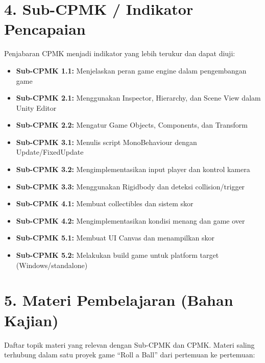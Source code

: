 \documentclass[12pt,a4paper]{article}
\begin{document}
\vspace{0.5cm}

\section*{4. Sub-CPMK / Indikator Pencapaian}

Penjabaran CPMK menjadi indikator yang lebih terukur dan dapat diuji:

\begin{itemize}[leftmargin=*]
  \item \textbf{Sub-CPMK 1.1:} Menjelaskan peran game engine dalam pengembangan game
  \item \textbf{Sub-CPMK 2.1:} Menggunakan Inspector, Hierarchy, dan Scene View dalam Unity Editor
  \item \textbf{Sub-CPMK 2.2:} Mengatur Game Objects, Components, dan Transform
  \item \textbf{Sub-CPMK 3.1:} Menulis script MonoBehaviour dengan Update/FixedUpdate
  \item \textbf{Sub-CPMK 3.2:} Mengimplementasikan input player dan kontrol kamera
  \item \textbf{Sub-CPMK 3.3:} Menggunakan Rigidbody dan deteksi collision/trigger
  \item \textbf{Sub-CPMK 4.1:} Membuat collectibles dan sistem skor
  \item \textbf{Sub-CPMK 4.2:} Mengimplementasikan kondisi menang dan game over
  \item \textbf{Sub-CPMK 5.1:} Membuat UI Canvas dan menampilkan skor
  \item \textbf{Sub-CPMK 5.2:} Melakukan build game untuk platform target (Windows/standalone)
\end{itemize}

\vspace{0.5cm}

\section*{5. Materi Pembelajaran (Bahan Kajian)}

Daftar topik materi yang relevan dengan Sub-CPMK dan CPMK. Materi saling terhubung dalam satu proyek game ``Roll a Ball'' dari pertemuan ke pertemuan:
\end{document}
